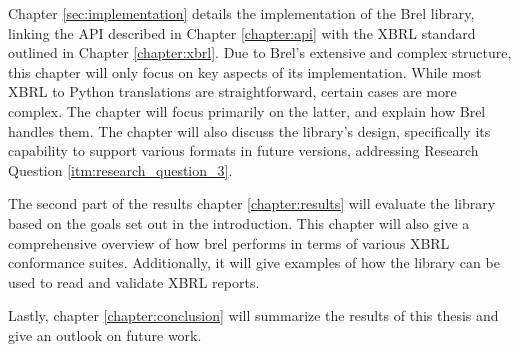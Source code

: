 Chapter \ref{sec:implementation} details the implementation of the Brel library, 
linking the API described in Chapter \ref{chapter:api} with the XBRL standard outlined in Chapter \ref{chapter:xbrl}. 
Due to Brel's extensive and complex structure, this chapter will only focus on key aspects of its implementation. 
While most XBRL to Python translations are straightforward, certain cases are more complex. 
The chapter will focus primarily on the latter, and explain how Brel handles them. 
The chapter will also discuss the library's design, specifically its capability to support various formats in future versions, 
addressing Research Question \ref{itm:research_question_3}.

The second part of the results chapter \ref{chapter:results} will evaluate the library based on the goals set out in the introduction.
This chapter will also give a comprehensive overview of how brel performs in terms of various XBRL conformance suites.
Additionally, it will give examples of how the library can be used to read and validate XBRL reports.

Lastly, chapter \ref{chapter:conclusion} will summarize the results of this thesis and give an outlook on future work.

